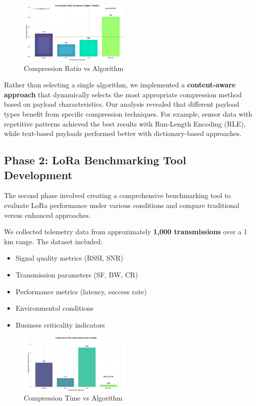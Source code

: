 \documentclass[conference]{IEEEtran}
\begin{document}
\begin{figure}[htbp]
\centering
\includegraphics[width=0.48\textwidth]{images/compression-ratio-vs-algorithm.png}
\caption{Compression Ratio vs Algorithm}
\label{fig:compression_ratio}
\end{figure}

Rather than selecting a single algorithm, we implemented a \textbf{content-aware approach} that dynamically selects the most appropriate compression method based on payload characteristics. Our analysis revealed that different payload types benefit from specific compression techniques. For example, sensor data with repetitive patterns achieved the best results with Run-Length Encoding (RLE), while text-based payloads performed better with dictionary-based approaches.

\subsection{Phase 2: LoRa Benchmarking Tool Development}
The second phase involved creating a comprehensive benchmarking tool to evaluate LoRa performance under various conditions and compare traditional versus enhanced approaches.

We collected telemetry data from approximately \textbf{1,000 transmissions} over a 1 km range. The dataset included:
\begin{itemize}
    \item Signal quality metrics (RSSI, SNR)
    \item Transmission parameters (SF, BW, CR)
    \item Performance metrics (latency, success rate)
    \item Environmental conditions
    \item Business criticality indicators
\end{itemize}

\begin{figure}[htbp]
\centering
\includegraphics[width=0.48\textwidth]{images/compression-time-vs-algorithm.png}
\caption{Compression Time vs Algorithm}
\label{fig:compression_time}
\end{figure}
\end{document}
